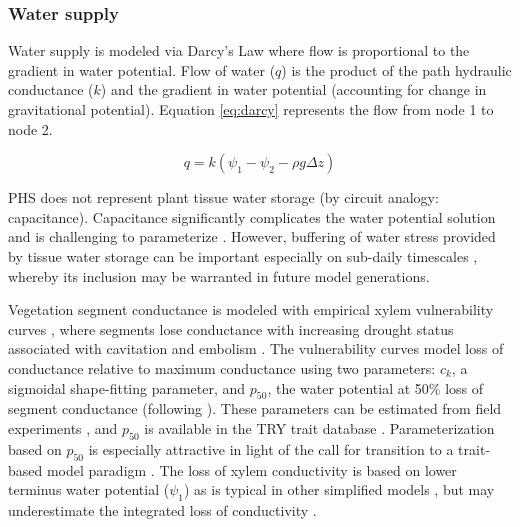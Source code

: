 \documentclass[draft,linenumbers]{agujournal}
\begin{document}
    \subsubsection{Water supply}
    \label{sect:supply}
    Water supply is modeled via Darcy's Law where flow is proportional to the gradient in water potential. 
    Flow of water ($q$) is the product of the path hydraulic conductance ($k$) and 
    the gradient in water potential (accounting for change in gravitational potential). 
    Equation \ref{eq:darcy} represents the flow from node 1 to node 2. 
    
     \begin{linenomath*}
     \begin{equation}
     \label{eq:darcy}
     q = k\left(\psi_1 - \psi_2 - \rho g \Delta z\right)
     \end{equation}
     \end{linenomath*}
    
    PHS does not represent plant tissue water storage (by circuit analogy: capacitance). 
    Capacitance significantly complicates the water potential solution \citep{celia1990}
    and is challenging to parameterize \citep{bartlett2016}.
    However, buffering of water stress provided by tissue water storage can be important
    especially on sub-daily timescales \citep{meinzer2009}, whereby its inclusion may be warranted 
    in future model generations.

     
     Vegetation segment conductance is modeled with empirical xylem vulnerability curves \citep{tyree1989}, 
     where segments lose conductance with increasing drought status associated with 
     cavitation and embolism \citep{holbrook2001}.
     The vulnerability curves model loss of conductance relative to maximum conductance using two parameters: 
     $c_k$, a sigmoidal shape-fitting parameter, and 
     $p_{50}$, the water potential at 50\% loss of segment conductance (following \cite{gentine2016}). 
     These parameters can be estimated from field experiments \citep{sack2002}, 
     and $p_{50}$ is available in the TRY trait database \citep{kattge2011}.
     Parameterization based on $p_{50}$ is especially attractive in light of the call for transition to
     a trait-based model paradigm \citep{anderegg2015a}.
     The loss of xylem conductivity is based on lower terminus water potential ($\psi_1$)
     as is typical in other simplified models \citep{xu2016}, but 
     may underestimate the integrated loss of conductivity \citep{sperry2015}. 
         
\end{document}
